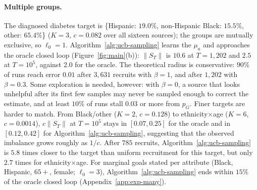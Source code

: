 \documentclass[twoside]{article}
\begin{document}
\paragraph{Multiple groups.}
The diagnosed diabetes target is \{Hispanic: \(19.0\%\), non-Hispanic Black:
\(15.5\%\), other: \(65.4\%\)\} (\(K=3\), \(c=0.082\) over all sixteen
sources); the groups are mutually exclusive, so \(\ell_0=1\).
Algorithm~\ref{alg:ucb-sampling} learns the \(\mu_a\) and approaches the
oracle closed loop (Figure~\ref{fig:main}(b)): \(\|S_T\|\) is \(10.6\) at
\(T=1{,}202\) and \(2.5\) at \(T=10^5\), against \(2.0\) for the oracle. The
theoretical radius is conservative: \(90\%\) of runs reach error \(0.01\)
after \(3{,}631\) recruits with \(\beta=1\), and after \(1{,}202\) with
\(\beta=0.3\). Some exploration is needed, however: with \(\beta=0\), a source
that looks unhelpful after its first few samples may never be sampled
enough to correct the estimate, and at least \(10\%\) of runs stall
\(0.03\) or more from \(p_G\). Finer targets are harder to match. From
Black/other (\(K=2\), \(c=0.128\)) to ethnicity\(\times\)age (\(K=6\),
\(c=0.0014\)), \(c\|S_T\|\) at \(T=10^5\) stays in \([0.07,0.25]\) for the
oracle and in \([0.12,0.42]\) for Algorithm~\ref{alg:ucb-sampling},
suggesting that the observed imbalance grows roughly as \(1/c\). After
\(785\) recruits, Algorithm~\ref{alg:ucb-sampling} is \(5.8\) times closer
to the target than uniform recruitment for this target, but only \(2.7\)
times for ethnicity\(\times\)age. For marginal goals stated per attribute
(Black, Hispanic, \(65+\), female; \(\ell_0=3\)),
Algorithm~\ref{alg:ucb-sampling} ends within \(15\%\) of the oracle closed
loop (Appendix~\ref{app:exp-many}).
\end{document}
